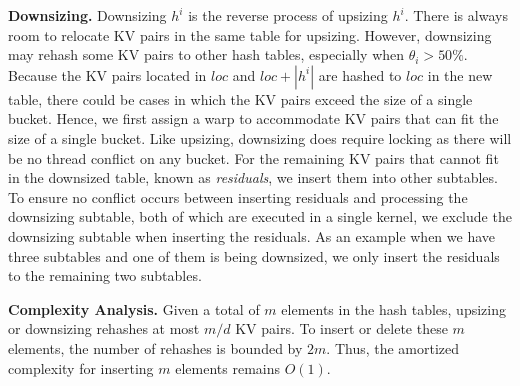 \vspace{1mm}\noindent\textbf{Downsizing.}
Downsizing $h^i$ is the reverse process of upsizing $h^i$. There is always room to relocate KV pairs in the same table for upsizing. 
However, downsizing may rehash some KV pairs to other hash tables, especially when $\theta_i > 50\%$.
Because the KV pairs located in $loc$ and $loc+|h^i|$ are hashed to $loc$ in the new table, there could be cases in which the KV pairs exceed the size of a single bucket. 
Hence, we first assign a warp to accommodate KV pairs that can fit the size of a single bucket. Like upsizing, downsizing does require locking as there will be no thread conflict on any bucket. 
For the remaining KV pairs that cannot fit in the downsized table, known as \emph{residuals}, we insert them into other subtables.
To ensure no conflict occurs between inserting residuals and processing the downsizing subtable, both of which are executed in a single kernel, we exclude the downsizing subtable when inserting the residuals. 
As an example when we have three subtables and one of them is being downsized, we only insert the residuals to the remaining two subtables. 



\vspace{1mm}\noindent\textbf{Complexity Analysis.}
Given a total of $m$ elements in the hash tables, upsizing or downsizing rehashes at most $m/d$ KV pairs. 
To insert or delete these $m$ elements, the number of rehashes is bounded by $2m$.
Thus, the amortized complexity for inserting $m$ elements remains $O(1)$.
